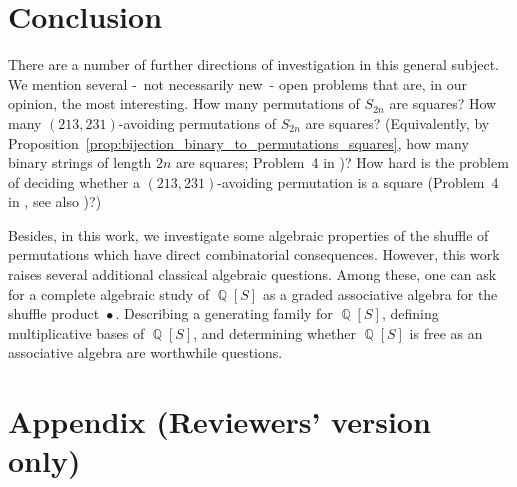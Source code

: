 \documentclass[a4paper]{llncs}
\DeclareMathOperator{\QQ}{\mathbb{Q}}
\DeclareMathOperator{\SHUFFLE}{\bullet}
\begin{document}

\section{Conclusion}
\label{section:Conclusion}

There are a number of further directions of investigation in this
general subject. We mention several -~not necessarily new~- open
problems that are, in our opinion, the most interesting. How many
permutations of $S_{2n}$ are squares? How many $(213,231)$-avoiding
permutations of $S_{2n}$ are squares? (Equivalently, by
Proposition~\ref{prop:bijection_binary_to_permutations_squares},
how many binary strings of length $2n$ are squares; Problem~4
in \cite{Henshall:Rampersad:Shallit:2011})? How hard is the problem of
deciding whether a $(213,231)$-avoiding permutation is a square
(Problem~4 in \cite{Henshall:Rampersad:Shallit:2011},
see also \cite{Buss:Soltys:2014,Rizzi:Vialette:CSR:2013})?)
\smallskip

Besides, in this work, we investigate some algebraic properties of the
shuffle of permutations which have direct combinatorial consequences.
However, this work raises several additional classical algebraic
questions. Among these, one can ask for a complete algebraic study of
$\QQ[S]$ as a graded associative algebra for the shuffle  product
$\SHUFFLE$. Describing a generating family for $\QQ[S]$, defining
multiplicative bases of $\QQ[S]$, and determining whether $\QQ[S]$ is
free as an associative algebra are worthwhile questions.







\newpage
\section*{Appendix (Reviewers' version only)}


\end{document}
